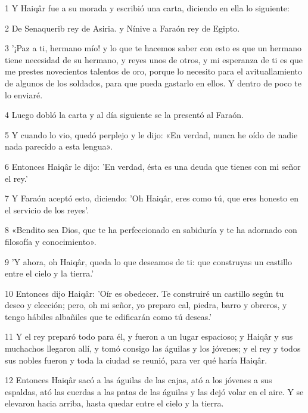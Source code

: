 \par 1 Y Haiqâr fue a su morada y escribió una carta, diciendo en ella lo siguiente:

\par 2 De Senaquerib rey de Asiria. y Nínive a Faraón rey de Egipto.

\par 3 '¡Paz a ti, hermano mío! y lo que te hacemos saber con esto es que un hermano tiene necesidad de su hermano, y reyes unos de otros, y mi esperanza de ti es que me prestes novecientos talentos de oro, porque lo necesito para el avituallamiento de algunos de los soldados, para que pueda gastarlo en ellos. Y dentro de poco te lo enviaré.

\par 4 Luego dobló la carta y al día siguiente se la presentó al Faraón.

\par 5 Y cuando lo vio, quedó perplejo y le dijo: «En verdad, nunca he oído de nadie nada parecido a esta lengua».

\par 6 Entonces Haiqâr le dijo: 'En verdad, ésta es una deuda que tienes con mi señor el rey.'

\par 7 Y Faraón aceptó esto, diciendo: 'Oh Haiqâr, eres como tú, que eres honesto en el servicio de los reyes'.

\par 8 «Bendito sea Dios, que te ha perfeccionado en sabiduría y te ha adornado con filosofía y conocimiento».

\par 9 'Y ahora, oh Haiqâr, queda lo que deseamos de ti: que construyas un castillo entre el cielo y la tierra.'

\par 10 Entonces dijo Haiqâr: 'Oír es obedecer. Te construiré un castillo según tu deseo y elección; pero, oh mi señor, yo preparo cal, piedra, barro y obreros, y tengo hábiles albañiles que te edificarán como tú deseas.'

\par 11 Y el rey preparó todo para él, y fueron a un lugar espacioso; y Haiqâr y sus muchachos llegaron allí, y tomó consigo las águilas y los jóvenes; y el rey y todos sus nobles fueron y toda la ciudad se reunió, para ver qué haría Haiqâr.

\par 12 Entonces Haiqâr sacó a las águilas de las cajas, ató a los jóvenes a sus espaldas, ató las cuerdas a las patas de las águilas y las dejó volar en el aire. Y se elevaron hacia arriba, hasta quedar entre el cielo y la tierra.

